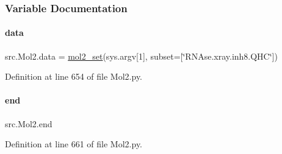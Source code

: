 \subsubsection{Variable Documentation}
\mbox{\label{namespacesrc_1_1Mol2_a12bf18db47042b1704de5e1fb05b2ade}} 
\paragraph{\texorpdfstring{data}{data}}
{\footnotesize\ttfamily src.\+Mol2.\+data = \hyperlink{classsrc_1_1Mol2_1_1mol2__set}{mol2\+\_\+set}(sys.\+argv\mbox{[}1\mbox{]}, subset=\mbox{[}\char`\"{}R\+N\+Ase.\+xray.\+inh8.\+Q\+HC\char`\"{}\mbox{]})}



Definition at line 654 of file Mol2.\+py.

\mbox{\label{namespacesrc_1_1Mol2_a9545d4f9df750b91128fa8d78b7ca8b2}} 
\paragraph{\texorpdfstring{end}{end}}
{\footnotesize\ttfamily src.\+Mol2.\+end}



Definition at line 661 of file Mol2.\+py.

